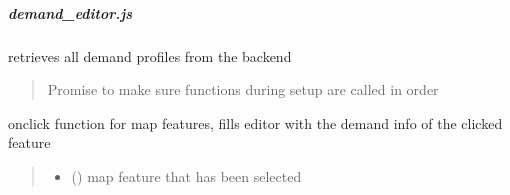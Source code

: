 \documentclass[letterpaper,10pt,english]{sphinxmanual}
\begin{document}
\sphinxstepscope


\subparagraph{demand\_editor.js}
\label{\detokenize{docs_gui/js_api/urbs_editor/demand_editor:demand-editor-js}}\label{\detokenize{docs_gui/js_api/urbs_editor/demand_editor::doc}}

\begin{fulllineitems}
\label{\detokenize{docs_gui/js_api/urbs_editor/demand_editor:fetchDemandProfiles}}
\pysigstartsignatures
{}
\pysigstopsignatures
\sphinxAtStartPar
retrieves all demand profiles from the backend
\begin{quote}\begin{description}
\sphinxAtStartPar
Promise to make sure functions during setup are called in order

\end{description}\end{quote}

\end{fulllineitems}


\begin{fulllineitems}
\label{\detokenize{docs_gui/js_api/urbs_editor/demand_editor:fillSelectedFeatureDemandEditor}}
\pysigstartsignatures
{}
\pysigstopsignatures
\sphinxAtStartPar
onclick function for map features, fills editor with the demand info of the clicked feature
\begin{quote}\begin{description}
\begin{itemize}
\item {} 
\sphinxAtStartPar
{} () \textendash{} map feature that has been selected

\end{itemize}

\end{description}\end{quote}

\end{fulllineitems}
\end{document}
